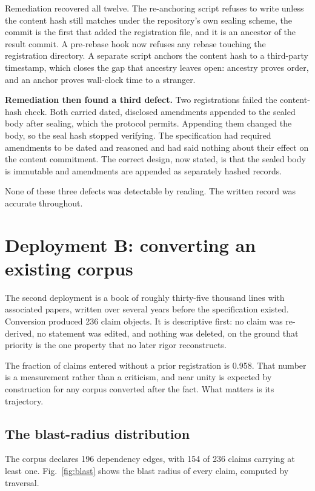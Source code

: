 \documentclass[journal]{IEEEtran}
\begin{document}
Remediation recovered all twelve. The re-anchoring script refuses to write unless
the content hash still matches under the repository's own sealing scheme, the
commit is the first that added the registration file, and it is an ancestor of
the result commit. A pre-rebase hook now refuses any rebase touching the
registration directory. A separate script anchors the content hash to a
third-party timestamp, which closes the gap that ancestry leaves open: ancestry
proves order, and an anchor proves wall-clock time to a stranger.

\textbf{Remediation then found a third defect.} Two registrations failed the
content-hash check. Both carried dated, disclosed amendments appended to the
sealed body after sealing, which the protocol permits. Appending them changed the
body, so the seal hash stopped verifying. The specification had required
amendments to be dated and reasoned and had said nothing about their effect on
the content commitment. The correct design, now stated, is that the sealed body
is immutable and amendments are appended as separately hashed records.

None of these three defects was detectable by reading. The written record was
accurate throughout.

\section{Deployment B: converting an existing corpus}
\label{sec:brownfield}

The second deployment is a book of roughly thirty-five thousand lines with
associated papers, written over several years before the specification existed.
Conversion produced 236 claim objects. It is descriptive first: no claim was
re-derived, no statement was edited, and nothing was deleted, on the ground that
priority is the one property that no later rigor reconstructs.

The fraction of claims entered without a prior registration is 0.958. That number
is a measurement rather than a criticism, and near unity is expected by
construction for any corpus converted after the fact. What matters is its
trajectory.

\subsection{The blast-radius distribution}

The corpus declares 196 dependency edges, with 154 of 236 claims carrying at
least one. Fig.~\ref{fig:blast} shows the blast radius of every claim, computed
by traversal.
\end{document}
